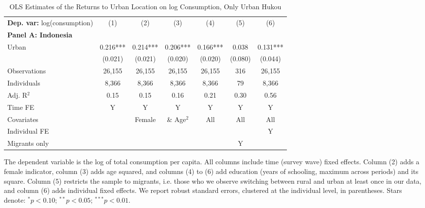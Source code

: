 \begin{table}[htbp] \centering \begin{threeparttable}
 \caption{OLS Estimates of the Returns to Urban Location on log Consumption, Only Urban Hukou} 
 \label{tab:OLS_CHN_hukou_urban_only_consumption_urban_unb} 
\begin{tabular}{l cccccc} \toprule  \textbf{Dep. var:}  log(consumption) 
                    &\multicolumn{1}{c}{(1)}   &\multicolumn{1}{c}{(2)}   &\multicolumn{1}{c}{(3)}   &\multicolumn{1}{c}{(4)}   &\multicolumn{1}{c}{(5)}   &\multicolumn{1}{c}{(6)}   \\
\textbf{Panel A: Indonesia} \\
Urban               &       0.216***&       0.214***&       0.206***&       0.166***&       0.038   &       0.131***\\
                    &     (0.021)   &     (0.021)   &     (0.020)   &     (0.020)   &     (0.080)   &     (0.044)   \\
\addlinespace
Observations        &      26,155   &      26,155   &      26,155   &      26,155   &         316   &      26,155   \\
Individuals         &       8,366   &       8,366   &       8,366   &       8,366   &          79   &       8,366   \\
Adj. R$^{2}$        &        0.15   &        0.15   &        0.16   &        0.21   &        0.30   &        0.56   \\
\cmidrule{2 -7} Time FE & Y & Y & Y & Y & Y & Y \\ Covariates & & Female & \& Age$^2$ & All & All & All \\ Individual FE & & & & & & Y \\ Migrants only & & & & & Y & \\ \bottomrule \end{tabular} \begin{tablenotes}[flushleft] \footnotesize \item{The dependent variable is the log of total consumption per capita. All columns include time (survey wave) fixed effects. Column (2) adds a female indicator, column (3) adds age squared, and columns (4) to (6) add education (years of schooling, maximum across periods) and its square. Column (5) restricts the sample to migrants, i.e. those who we observe switching between rural and urban at least once in our data, and column (6) adds individual fixed effects. We report robust standard errors, clustered at the individual level, in parentheses. Stars denote: $^{*} p<0.10$; $^{**} p<0.05$; $^{***} p<0.01$.} \end{tablenotes} \end{threeparttable} \end{table}
